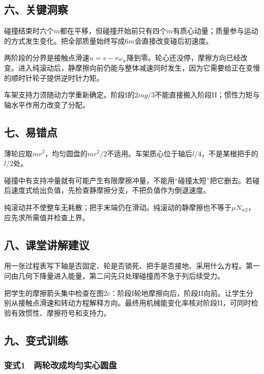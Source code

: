\documentclass[12pt,a4paper,fontset=fandol]{ctexart}
\begin{document}
\subsection{六、关键洞察}\label{ux516dux5173ux952eux6d1eux5bdf-1}

碰撞结束时六个\(m\)都在平移，但碰撞开始前只有四个\(m\)有质心动量；质量参与运动的方式发生变化。把全部质量始终写成\(6m\)会直接改变碰后初速度。

两阶段的分界是接触点滑速\(u=v-r\omega_w\)降到零。轮心还没停，摩擦方向已经改变。进入纯滚动后，静摩擦向前仍能与整体减速同时发生，因为它需要给正在变慢的顺时针轮子提供逆时针力矩。

车架支持力须随动力学重新确定。阶段I的\(2mg/3\)不能直接搬入阶段II；惯性力矩与轴水平作用力改变了分配。

\subsection{七、易错点}\label{ux4e03ux6613ux9519ux70b9-1}

薄轮应取\(mr^2\)，均匀圆盘的\(mr^2/2\)不适用。车架质心位于轴后\(l/4\)，不是某根把手的\(l/2\)处。

碰撞中有支持冲量就有可能产生有限摩擦冲量，不能用``碰撞太短''把它删去。若碰后速度式给出负值，先检查静摩擦分支，不把负值作为倒退速度。

纯滚动并不使整车无耗散；把手末端仍在滑动。纯滚动的静摩擦也不等于\(\mu N_{w2}\)，应先求所需值并检查上界。

\subsection{八、课堂讲解建议}\label{ux516bux8bfeux5802ux8bb2ux89e3ux5efaux8bae-1}

用一张过程表写下轴是否固定、轮是否锁死、把手是否接地、采用什么方程。第一问由几何下降量进入能量，第二问先只处理碰撞而不急于列后续受力。

把学生的摩擦箭头集中检查在图2c：阶段I轮地摩擦向后，阶段II向前。让学生分别从接触点滑速和转动方程解释方向。最终用机械能变化率核对阶段II，可同时检验有效惯性、摩擦符号和支持力。

\subsection{九、变式训练}\label{ux4e5dux53d8ux5f0fux8badux7ec3-1}

\subsubsection{变式1　两轮改成均匀实心圆盘}\label{ux53d8ux5f0f1-ux4e24ux8f6eux6539ux6210ux5747ux5300ux5b9eux5fc3ux5706ux76d8}
\end{document}
